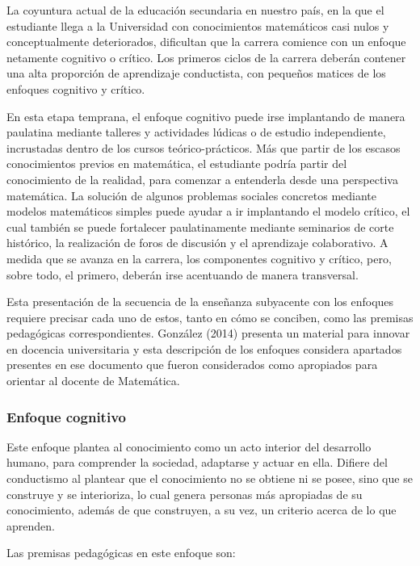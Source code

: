 La coyuntura actual de la educación secundaria en nuestro país, en la que el estudiante llega a la Universidad con conocimientos matemáticos casi nulos y conceptualmente deteriorados, dificultan que la carrera comience con un enfoque netamente cognitivo o crítico. Los primeros ciclos de la carrera deberán contener una alta proporción de aprendizaje conductista, con pequeños matices de los enfoques cognitivo y crítico. 

En esta etapa temprana, el enfoque cognitivo puede irse implantando de manera paulatina mediante talleres y actividades lúdicas o de estudio independiente, incrustadas dentro de los cursos teórico-prácticos. Más que partir de los escasos conocimientos previos en matemática, el estudiante podría partir del conocimiento de la realidad, para comenzar a entenderla desde una perspectiva matemática. La solución de algunos problemas sociales concretos mediante modelos matemáticos simples puede ayudar a ir implantando el modelo crítico, el cual también se puede fortalecer paulatinamente mediante seminarios de corte histórico, la realización de foros de discusión y el aprendizaje colaborativo. A medida que se avanza en la carrera, los componentes cognitivo y crítico, pero, sobre todo, el primero, deberán irse acentuando de manera transversal. 

Esta presentación de la secuencia de la enseñanza subyacente con los enfoques requiere precisar cada uno de estos, tanto en cómo se conciben, como las premisas pedagógicas correspondientes. González (2014) presenta un material para innovar en docencia universitaria y esta descripción de los enfoques considera apartados presentes en ese documento que fueron considerados como apropiados para orientar al docente de Matemática. 

\subsubsection*{Enfoque cognitivo}

Este enfoque plantea al conocimiento como un acto interior del desarrollo humano, para comprender la sociedad, adaptarse y actuar en ella.  Difiere del conductismo al plantear que el conocimiento no se obtiene ni se posee, sino que se construye y se interioriza, lo cual genera personas más apropiadas de su conocimiento, además de que construyen, a su vez, un criterio acerca de lo que aprenden. 

Las premisas pedagógicas en este enfoque son: 


